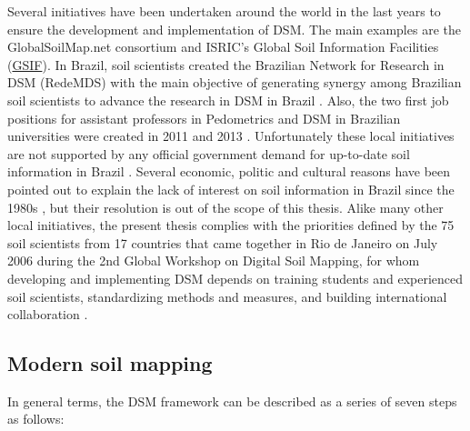 Several initiatives have been undertaken around the world in the last years to 
ensure the development and implementation of DSM. The main examples are the 
GlobalSoilMap.net consortium and ISRIC's Global Soil Information Facilities
(\href{http://www.isric.org/projects/global-soil-information-facilities-gsif}{GSIF}).
In Brazil, soil scientists created the Brazilian Network for Research in DSM 
(RedeMDS) with the main objective of generating synergy among Brazilian soil 
scientists to advance the research in DSM in Brazil \cite{RedeMDS2013}. Also, 
the two first job positions for assistant professors in Pedometrics and DSM in 
Brazilian universities were created in 2011 and 2013 \cite{UFRRJ2011,UFSM2012}. 
Unfortunately these local initiatives are not supported by any official 
government demand for up-to-date soil information in Brazil 
\cite{SamuelRosa2012}. Several economic, politic and cultural reasons have been 
pointed out to explain the lack of interest on soil information in Brazil since 
the 1980s \cite{Dalmolin1999, Ker1999, KerEtAl2003, Ramos2003, Espindola2008}, 
but their resolution is out of the scope of this thesis. Alike many other local
initiatives, the present thesis complies with the priorities defined by the 75 
soil scientists from 17 countries that came together in Rio de Janeiro on July 
2006 during the 2nd Global Workshop on Digital Soil Mapping, for whom developing
and implementing DSM depends on training students and experienced soil 
scientists, standardizing methods and measures, and building international 
collaboration \cite{Boettinger2004}.

\subsection{Modern soil mapping}

In general terms, the DSM framework can be described as a series of seven steps 
as follows:

